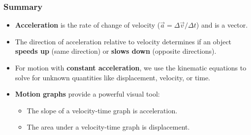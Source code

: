 \documentclass{beamer}
\begin{document}
\begin{frame}
\frametitle{Summary}
\begin{itemize}
    \item \textbf{Acceleration} is the rate of change of velocity ($\vec{a} = \Delta\vec{v} / \Delta t$) and is a vector.
    \pause
    \item The direction of acceleration relative to velocity determines if an object \textbf{speeds up} (same direction) or \textbf{slows down} (opposite directions).
    \pause
    \item For motion with \textbf{constant acceleration}, we use the kinematic equations to solve for unknown quantities like displacement, velocity, or time.
    \pause
    \item \textbf{Motion graphs} provide a powerful visual tool:
    \begin{itemize}
        \item The slope of a velocity-time graph is \alert{acceleration}.
        \item The area under a velocity-time graph is \alert{displacement}.
    \end{itemize}
\end{itemize}
\end{frame}
\end{document}
